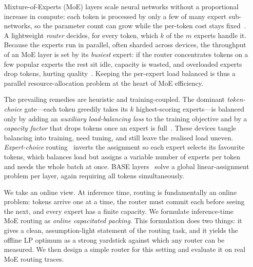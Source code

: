 \documentclass[preprint,12pt]{elsarticle}
\theoremstyle{plain}
\theoremstyle{remark}
\begin{document}
Mixture-of-Experts (MoE) layers scale neural networks without a
proportional increase in compute: each token is processed by only a few of
many expert sub-networks, so the parameter count can grow while the
per-token cost stays fixed~\cite{shazeer2017,switch}. A lightweight
\emph{router} decides, for every token, which $k$ of the $m$ experts handle
it. Because the experts run in parallel, often sharded across devices, the
throughput of an MoE layer is set by its \emph{busiest} expert: if the
router concentrates tokens on a few popular experts the rest sit idle,
capacity is wasted, and overloaded experts drop tokens, hurting
quality~\cite{gshard,switch}. Keeping the per-expert load balanced is thus a
parallel resource-allocation problem at the heart of MoE efficiency.

The prevailing remedies are heuristic and training-coupled. The dominant
\emph{token-choice} gate---each token greedily takes its $k$ highest-scoring
experts---is balanced only by adding an \emph{auxiliary load-balancing
loss} to the training objective and by a \emph{capacity factor} that drops
tokens once an expert is full~\cite{switch,gshard}. These devices tangle
balancing into training, need tuning, and still leave the realised load
uneven. \emph{Expert-choice} routing~\cite{expertchoice} inverts the
assignment so each expert selects its favourite tokens, which balances load
but assigns a variable number of experts per token and needs the whole
batch at once. \textsc{BASE} layers~\cite{baselayers} solve a global
linear-assignment problem per layer, again requiring all tokens
simultaneously.

We take an online view. At inference time, routing is fundamentally an
online problem: tokens arrive one at a time, the router must commit each
before seeing the next, and every expert has a finite capacity. We
formulate inference-time MoE routing as \emph{online capacitated packing}.
This formulation does two things: it gives a clean, assumption-light
statement of the routing task, and it yields the offline LP optimum as a
strong yardstick against which any router can be measured. We then design a
simple router for this setting and evaluate it on real MoE routing traces.
\end{document}
